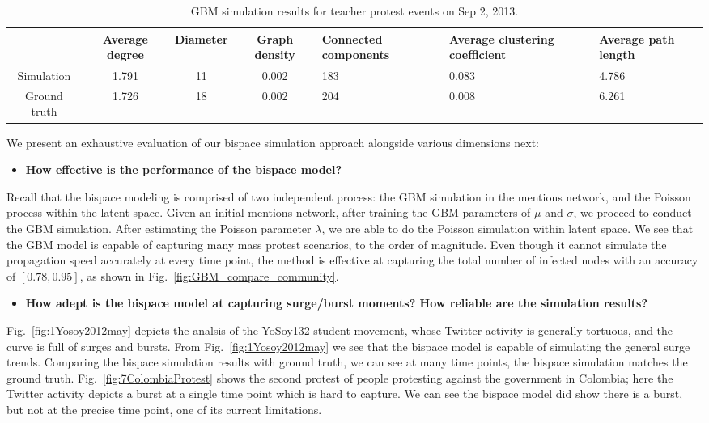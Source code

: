 \begin{table}[!ht]
\tiny
\caption{GBM simulation results for teacher protest events on Sep 2, 2013.}
\vspace{0.5em}
\centering
\begin{tabular}{|c | c | c | c | p{3cm}<{\centering} | p{2.5cm}<{\centering} | p{2.5cm}<{\centering} |}
\hline
& Average degree & Diameter & Graph density &Connected components& Average clustering coefficient & Average path length  \\ [1ex]
\hline
Simulation& 1.791 & 11&  0.002& 183& 0.083 & 4.786  \\[1ex]
\hline
Ground truth&  1.726 & 18 & 0.002 & 204& 0.008 & 6.261  \\[1ex]
\hline
\end{tabular}
\label{table:simulation_location}
\end{table}


We present an exhaustive evaluation of our bispace simulation approach
alongside various dimensions next:

\begin{itemize}
  \item \textbf{How effective is the performance of the bispace model?}
\end{itemize}
Recall that
the bispace modeling is comprised of
two independent process: the GBM simulation in the mentions network,
and
the Poisson process within the latent space.
Given an initial mentions
network, after training the GBM parameters of $\mu$ and $\sigma$, we proceed to conduct the GBM simulation. After estimating the Poisson parameter $\lambda$, we are able to do the
Poisson simulation within latent space.
We see that the GBM model
is capable of capturing many mass protest scenarios, to the order of magnitude.
Even though it cannot simulate the propagation speed accurately
at every time point, the method is effective at capturing the total
number of infected nodes with an accuracy of $[0.78,0.95]$, as shown
in Fig.~\ref{fig:GBM_compare_community}.

\begin{itemize}
  \item \textbf{How adept is the bispace
model at capturing surge/burst moments?
How reliable are the simulation results?}
\end{itemize}
Fig.~\ref{fig:1Yosoy2012may} depicts the analsis
of the YoSoy132 student movement, whose Twitter activity is generally tortuous, and the curve is full of surges and bursts. From
Fig.~\ref{fig:1Yosoy2012may} we see that the bispace model is
capable of simulating the general surge trends. Comparing
the bispace simulation results with ground truth, we can see
at many time points, the bispace simulation matches the ground truth.
Fig.~\ref{fig:7ColombiaProtest} shows the second protest of people protesting
against the government in Colombia; here
the Twitter activity depicts a burst at a single time point which is
hard to capture. We can see the bispace model did show there is
a burst, but not at the precise
time point, one of its current limitations.


